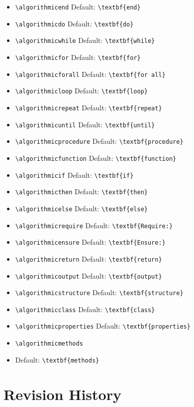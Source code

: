 \documentclass[11pt,a4paper,USenglish]{article}
\begin{document}
\begin{itemize}
	\item \verb|\algorithmicend|
	\hfill Default: \verb|\textbf{end}|
	\item \verb|\algorithmicdo|
	\hfill Default: \verb|\textbf{do}|
	\item \verb|\algorithmicwhile|
	\hfill Default: \verb|\textbf{while}|
	\item \verb|\algorithmicfor|
	\hfill Default: \verb|\textbf{for}|
	\item \verb|\algorithmicforall|
	\hfill Default: \verb|\textbf{for all}|
	\item \verb|\algorithmicloop|
	\hfill Default: \verb|\textbf{loop}|
	\item \verb|\algorithmicrepeat|
	\hfill Default: \verb|\textbf{repeat}|
	\item \verb|\algorithmicuntil|
	\hfill Default: \verb|\textbf{until}|
	\item \verb|\algorithmicprocedure|
	\hfill Default: \verb|\textbf{procedure}|
	\item \verb|\algorithmicfunction|
	\hfill Default: \verb|\textbf{function}|
	\item \verb|\algorithmicif|
	\hfill Default: \verb|\textbf{if}|
	\item \verb|\algorithmicthen|
	\hfill Default: \verb|\textbf{then}|
	\item \verb|\algorithmicelse|
	\hfill Default: \verb|\textbf{else}|
	\item \verb|\algorithmicrequire|
	\hfill Default: \verb|\textbf{Require:}|
	\item \verb|\algorithmicensure|
	\hfill Default: \verb|\textbf{Ensure:}|
	\item \verb|\algorithmicreturn|
	\hfill Default: \verb|\textbf{return}|
	\item \verb|\algorithmicoutput|
	\hfill Default: \verb|\textbf{output}|
  \item \verb|\algorithmicstructure|
  \hfill Default: \verb|\textbf{structure}|
  \item \verb|\algorithmicclass|
  \hfill Default: \verb|\textbf{class}|
  \item \verb|\algorithmicproperties|
  \hfill Default: \verb|\textbf{properties}|
  \item \verb|\algorithmicmethods|
  \item \hfill Default: \verb|\textbf{methods}|
\end{itemize}

\section{Revision History}
\end{document}
